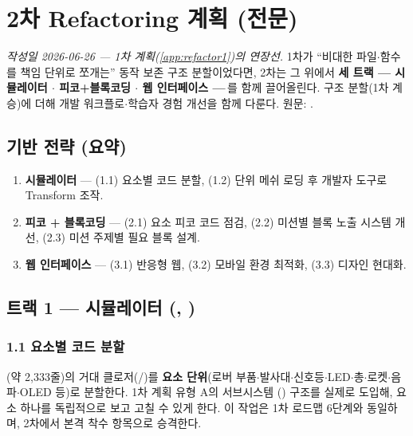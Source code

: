 \chapter{2차 Refactoring 계획 (전문)}
\label{app:refactor2}

\textit{작성일 2026-06-26 --- 1차 계획(\ref{app:refactor1})의 연장선.}
1차가 ``비대한 파일$\cdot$함수를 책임 단위로 쪼개는'' 동작 보존 구조 분할이었다면,
2차는 그 위에서 \textbf{세 트랙 --- 시뮬레이터 $\cdot$ 피코+블록코딩 $\cdot$ 웹
인터페이스 ---}\,를 함께 끌어올린다. 구조 분할(1차 계승)에 더해 개발 워크플로$\cdot$학습자
경험 개선을 함께 다룬다. 원문: .

\section{기반 전략 (요약)}
\begin{enumerate}
  \item \textbf{시뮬레이터} --- (1.1) 요소별 코드 분할, (1.2) 단위 메쉬 로딩 후 개발자
  도구로 Transform 조작.
  \item \textbf{피코 + 블록코딩} --- (2.1) 요소 피코 코드 점검, (2.2) 미션별 블록 노출
  시스템 개선, (2.3) 미션 주제별 필요 블록 설계.
  \item \textbf{웹 인터페이스} --- (3.1) 반응형 웹, (3.2) 모바일 환경 최적화, (3.3) 디자인
  현대화.
\end{enumerate}

\section{트랙 1 --- 시뮬레이터 (, )}

\subsection{1.1 요소별 코드 분할}
(약 2,333줄)의 거대 클로저(/)를
\textbf{요소 단위}(로버 부품$\cdot$발사대$\cdot$신호등$\cdot$LED$\cdot$총$\cdot$로켓$\cdot$음파$\cdot$OLED 등)로 분할한다. 1차 계획 유형 A의  서브시스템
()
구조를 실제로 도입해, 요소 하나를 독립적으로 보고 고칠 수 있게 한다. 이 작업은
1차 로드맵 6단계와 동일하며, 2차에서 본격 착수 항목으로 승격한다.

